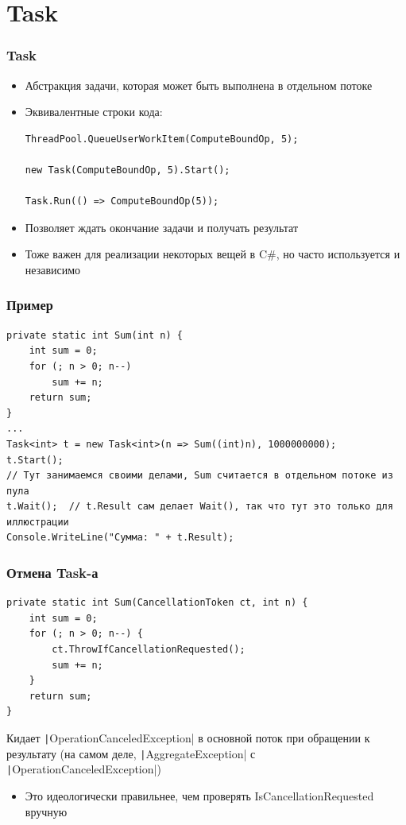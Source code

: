 \documentclass{../../slides-style}
\begin{document}
    \section{Task}

    \begin{frame}[fragile]
        \frametitle{Task}
        \begin{itemize}
            \item Абстракция задачи, которая может быть выполнена в отдельном потоке
            \item Эквивалентные строки кода:
                \begin{verbatim}
ThreadPool.QueueUserWorkItem(ComputeBoundOp, 5);

new Task(ComputeBoundOp, 5).Start();

Task.Run(() => ComputeBoundOp(5));
                \end{verbatim}
            \item Позволяет ждать окончание задачи и получать результат
            \item Тоже важен для реализации некоторых вещей в C\#, но часто используется и независимо
        \end{itemize}
    \end{frame}

    \begin{frame}[fragile]
        \frametitle{Пример}
        \begin{footnotesize}
            \begin{verbatim}
private static int Sum(int n) {
    int sum = 0;
    for (; n > 0; n--)
        sum += n;
    return sum;
}
...
Task<int> t = new Task<int>(n => Sum((int)n), 1000000000);
t.Start();
// Тут занимаемся своими делами, Sum считается в отдельном потоке из пула
t.Wait();  // t.Result сам делает Wait(), так что тут это только для иллюстрации
Console.WriteLine("Сумма: " + t.Result);
            \end{verbatim}
        \end{footnotesize}
    \end{frame}

    \begin{frame}[fragile]
        \frametitle{Отмена Task-а}
        \begin{verbatim}
private static int Sum(CancellationToken ct, int n) {
    int sum = 0;
    for (; n > 0; n--) {
        ct.ThrowIfCancellationRequested();
        sum += n;
    }
    return sum;
}
        \end{verbatim}
        \vspace{3mm}
        Кидает \texttt|OperationCanceledException| в основной поток при обращении к результату (на самом деле, \texttt|AggregateException| с \texttt|OperationCanceledException|)
        \begin{itemize}
            \item Это идеологически правильнее, чем проверять IsCancellationRequested вручную
        \end{itemize}
    \end{frame}
\end{document}
